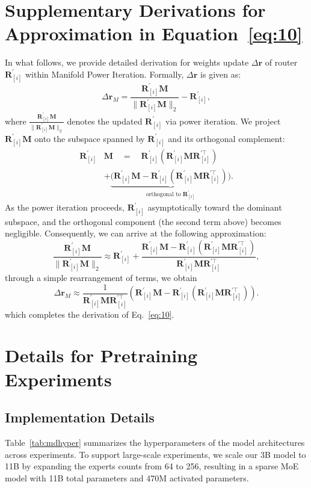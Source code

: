\documentclass{llmxive}
\providecommand{\bm}[1]{\boldsymbol{#1}}
\providecommand{\Name}{Manifold Power Iteration}
\providecommand{\vr}{{\bm{r}}}
\providecommand{\mM}{{\bm{M}}}
\providecommand{\mR}{{\bm{R}}}
\begin{document}






\appendix

\section{Supplementary Derivations for Approximation in Equation~\ref{eq:10}}
\label{apx:math}
In what follows, we provide detailed derivation for weights update $\Delta \vr$ of router $\mR_{[i]}^\prime$ within \Name.
Formally, $\Delta \vr$ is given as:
\[
    {\Delta \vr}_{M} = \frac{\mR_{[i]}^\prime\mM}{\|\mR_{[i]}^\prime\mM\|_2} -  \mR_{[i]}^\prime,
\]
where $\frac{\mR_{[i]}^\prime\mM}{\|\mR_{[i]}^\prime\mM\|_2}$ denotes the updated $\mR_{[i]}^\prime$ via power iteration.
We project $\mR_{[i]}^\prime \mM$ onto the subspace spanned by $\mR_{[i]}^\prime$ and its orthogonal complement:
\[
\begin{split}
    \mR_{[i]}^\prime &{} \mM \quad = \quad \mR_{[i]}^\prime \left(\mR_{[i]}^\prime \mM\mR_{[i]}^{\prime\top}\right) \\
   & + \underbrace{\Big(\mR_{[i]}^\prime\mM - \mR_{[i]}^\prime \left(\mR_{[i]}^\prime \mM\mR_{[i]}^{\prime\top}\right)\Big)}_{\text{orthogonal to } \mR_{[i]}^\prime}.
\end{split}
\]
As the power iteration proceeds, $\mR_{[i]}^\prime$ asymptotically toward the dominant subspace, and the orthogonal component (the second term above) becomes negligible. Consequently, we can arrive at the following approximation:
\[
    \frac{\mR_{[i]}^\prime\mM}{\|\mR_{[i]}^\prime\mM\|_2} \approx \mR_{[i]}^\prime + \frac{\mR_{[i]}^\prime \mM - \mR_{[i]}^\prime(\mR_{[i]}^\prime \mM \mR_{[i]}^{\prime\top}) }{\mR_{[i]}^\prime \mM \mR_{[i]}^{\prime\top}},
\]
through a simple rearrangement of terms, we obtain
\[
    {\Delta \vr}_{M} \approx \frac{1}{\mR_{[i]}^\prime \mM \mR_{[i]}^{\prime\top}} {\left( \mR_{[i]}^\prime \mM - \mR_{[i]}^\prime(\mR_{[i]}^\prime \mM \mR_{[i]}^{\prime\top}) \right)}. 
\]
which completes the derivation of Eq.~\ref{eq:10}.

\section{Details for Pretraining Experiments}
\label{apx:details}
\subsection{Implementation Details}
Table~\ref{tab:mdhyper} summarizes the hyperparameters of the model architectures across experiments. 
To support large-scale experiments, we scale our 3B model to 11B by expanding the experts counts from 64 to 256, resulting in a sparse MoE model with 11B total parameters and 470M activated parameters.
\end{document}
